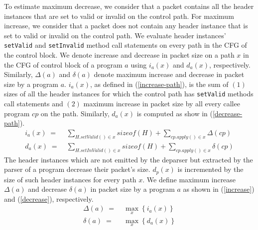 To estimate maximum decrease, we consider that a packet contains all the header instances that are set to valid or invalid on the control path.
For maximum increase, we consider that a packet does not contain any header instance that is set to valid or invalid on the control path. 
We evaluate header instances' \texttt{setValid} and \texttt{setInvalid} method call statements on every path in the CFG of the control block.
We denote increase and decrease in packet size on a path $x$ in the CFG of control block of a program $a$ using $i_{a}(x)$ and $d_{a}(x)$, respectively.
Similarly, $\Delta(a)$ and $\delta(a)$ denote maximum increase and decrease in packet size by a program $a$.
$i_{a}(x)$, as defined in (\ref{increase-path}), is the sum of $(1)$ sizes of all the header instances for which the control path has \texttt{setValid} methods call statements and $(2)$ maximum increase in packet size by all every callee program $cp$ on the path.
Similarly, $d_{a}(x)$ is computed as show in (\ref{decrease-path}).
\begin{align}
i_{a}(x)\; =& \; \sum_{H.setValid() \in x} sizeof(H) + \sum_{cp.apply()\in x} \Delta(cp) \label{increase-path} \\
d_{a}(x)\; =& \; \sum_{H.setInValid() \in x} sizeof(H) + \sum_{cp.apply()\in x} \delta(cp) \label{decrease-path}
\end{align}
The header instances which are not emitted by the deparser but extracted by the parser of a program decrease their packet's size. 
$d_{p}(x)$ is incremented by the size of such header instances for every path $x$.
We define maximum increase $\Delta(a)$ and decrease $\delta(a)$ in packet size by a program $a$ as shown in (\ref{increase}) and (\ref{decrease}), respectively.
\begin{align}
\Delta(a)\; =& \; \max_{x} \left\{ i_{a}(x) \right\} \label{increase} \\
\delta(a)\; =& \; \max_{x} \left\{ d_{a}(x) \right\} \label{decrease}
\end{align}


